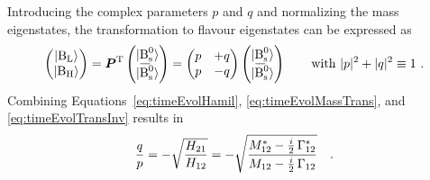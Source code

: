 Introducing the complex parameters $p$ and $q$ and normalizing the mass eigenstates, the transformation to flavour eigenstates can be
expressed as
\begin{equation}
  \label{eq:timeEvolTransInv}
  \begin{pmatrix} \BLst \\ \BHst \end{pmatrix}
    = \vec{P}^\text{T} \begin{pmatrix} \Bsst \\ \Bsbarst \end{pmatrix}
    = \begin{pmatrix} p & +q \\ p & -q \end{pmatrix}
      \begin{pmatrix} \Bsst \\ \Bsbarst \end{pmatrix}
  \qquad
  \text{with } |p|^2+|q|^2\equiv1
  \ .
\end{equation}
Combining Equations~\ref{eq:timeEvolHamil}, \ref{eq:timeEvolMassTrans}, and \ref{eq:timeEvolTransInv} results in
\begin{equation}
  \label{eq:qpDef}
  \frac{q}{p} = -\sqrt{\frac{H_{21}}{H_{12}}} = -\sqrt{\frac{M_\text{12}^*-\tfrac{i}{2}\,\Gamma_\text{12}^*}{M_\text{12}-\tfrac{i}{2}\,\Gamma_\text{12}}}
  \quad .
\end{equation}

